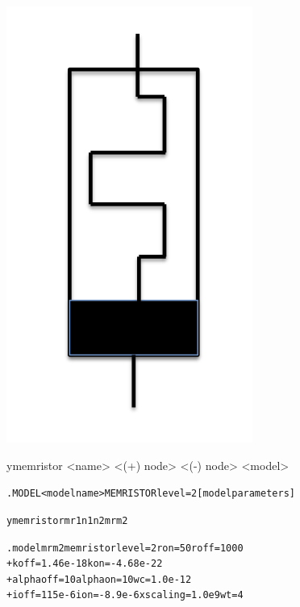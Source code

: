 


\begin{Device}

\symbol
{\includegraphics[scale=.2, angle=90]{MemristorSymbol}}

\device
ymemristor <name> <(+) node> <(-) node> <model>

\model
\begin{alltt}
.MODEL <model name> MEMRISTOR level=2 [model parameters]
\end{alltt}

\examples
\begin{alltt}

ymemristor mr1 n1 n2 mrm2

.model mrm2 memristor level=2 ron=50 roff=1000 
+ koff=1.46e-18 kon=-4.68e-22 
+ alphaoff=10 alphaon=10 wc=1.0e-12 
+ ioff=115e-6 ion=-8.9e-6 xscaling=1.0e9 wt=4



\end{alltt}
\end{Device}
